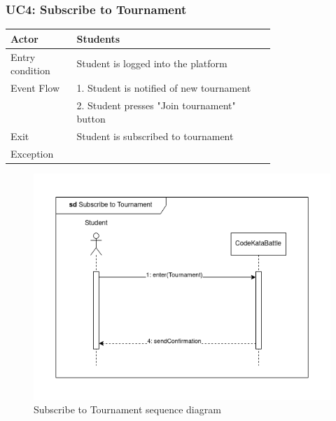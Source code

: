 \newpage
\subsubsection{UC4: Subscribe to Tournament}
\begin{center}
    \begin{longtable}{lp{0.75\linewidth}}
        \hline
            Actor & Students\\
        \hline
            Entry condition & Student is logged into the platform\\
        \hline
            Event Flow & 1. Student is notified of new tournament\\
                       & 2. Student presses "Join tournament" button\\
        \hline
            Exit & Student is subscribed to tournament\\
        \hline
            Exception & \\
        \hline
    \end{longtable}
\end{center}

\begin{figure}[H]
    \centering
    \includegraphics[width=1\linewidth]{misc//Images//UC Diagrams/UC4.png}
    \caption{Subscribe to Tournament sequence diagram}
    \label{fig:enter-label}
\end{figure}

\newpage
